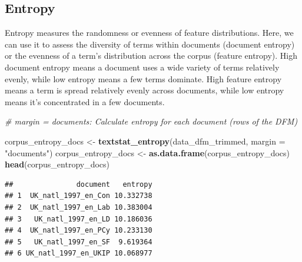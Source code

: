 \documentclass[
]{book}
\newenvironment{Shaded}{\begin{snugshade}}{\end{snugshade}}
\newcommand{\AttributeTok}[1]{\textcolor[rgb]{0.13,0.29,0.53}{#1}}
\newcommand{\CommentTok}[1]{\textcolor[rgb]{0.56,0.35,0.01}{\textit{#1}}}
\newcommand{\DecValTok}[1]{\textcolor[rgb]{0.00,0.00,0.81}{#1}}
\newcommand{\FunctionTok}[1]{\textcolor[rgb]{0.13,0.29,0.53}{\textbf{#1}}}
\newcommand{\NormalTok}[1]{#1}
\newcommand{\OtherTok}[1]{\textcolor[rgb]{0.56,0.35,0.01}{#1}}
\newcommand{\SpecialCharTok}[1]{\textcolor[rgb]{0.81,0.36,0.00}{\textbf{#1}}}
\newcommand{\StringTok}[1]{\textcolor[rgb]{0.31,0.60,0.02}{#1}}
\begin{document}
\subsection{Entropy}\label{entropy}

Entropy measures the randomness or evenness of feature distributions. Here, we can use it to assess the diversity of terms within documents (document entropy) or the evenness of a term's distribution across the corpus (feature entropy). High document entropy means a document uses a wide variety of terms relatively evenly, while low entropy means a few terms dominate. High feature entropy means a term is spread relatively evenly across documents, while low entropy means it's concentrated in a few documents.

\begin{Shaded}
\begin{Highlighting}[]
\CommentTok{\# margin = \textquotesingle{}documents\textquotesingle{}: Calculate entropy for each document (rows of the DFM)}

\NormalTok{corpus\_entropy\_docs }\OtherTok{\textless{}{-}} \FunctionTok{textstat\_entropy}\NormalTok{(data\_dfm\_trimmed, }\AttributeTok{margin =} \StringTok{"documents"}\NormalTok{)}
\NormalTok{corpus\_entropy\_docs }\OtherTok{\textless{}{-}} \FunctionTok{as.data.frame}\NormalTok{(corpus\_entropy\_docs)}
\FunctionTok{head}\NormalTok{(corpus\_entropy\_docs)}
\end{Highlighting}
\end{Shaded}

\begin{verbatim}
##               document   entropy
## 1  UK_natl_1997_en_Con 10.332738
## 2  UK_natl_1997_en_Lab 10.383004
## 3   UK_natl_1997_en_LD 10.186036
## 4  UK_natl_1997_en_PCy 10.233130
## 5   UK_natl_1997_en_SF  9.619364
## 6 UK_natl_1997_en_UKIP 10.068977
\end{verbatim}

\begin{Shaded}
\end{Shaded}
\end{document}
